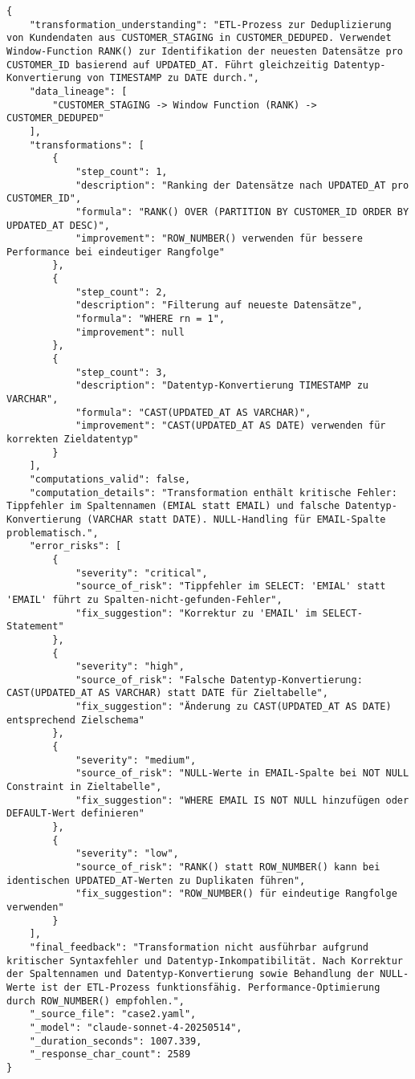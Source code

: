 \begin{lstlisting}[caption={Ausgabe: Claude Sonnet 4 Anwendungsfall 2 Hauptdurchlauf},label={claude_case2_prompt1}]
{
    "transformation_understanding": "ETL-Prozess zur Deduplizierung von Kundendaten aus CUSTOMER_STAGING in CUSTOMER_DEDUPED. Verwendet Window-Function RANK() zur Identifikation der neuesten Datensätze pro CUSTOMER_ID basierend auf UPDATED_AT. Führt gleichzeitig Datentyp-Konvertierung von TIMESTAMP zu DATE durch.",
    "data_lineage": [
        "CUSTOMER_STAGING -> Window Function (RANK) -> CUSTOMER_DEDUPED"
    ],
    "transformations": [
        {
            "step_count": 1,
            "description": "Ranking der Datensätze nach UPDATED_AT pro CUSTOMER_ID",
            "formula": "RANK() OVER (PARTITION BY CUSTOMER_ID ORDER BY UPDATED_AT DESC)",
            "improvement": "ROW_NUMBER() verwenden für bessere Performance bei eindeutiger Rangfolge"
        },
        {
            "step_count": 2,
            "description": "Filterung auf neueste Datensätze",
            "formula": "WHERE rn = 1",
            "improvement": null
        },
        {
            "step_count": 3,
            "description": "Datentyp-Konvertierung TIMESTAMP zu VARCHAR",
            "formula": "CAST(UPDATED_AT AS VARCHAR)",
            "improvement": "CAST(UPDATED_AT AS DATE) verwenden für korrekten Zieldatentyp"
        }
    ],
    "computations_valid": false,
    "computation_details": "Transformation enthält kritische Fehler: Tippfehler im Spaltennamen (EMIAL statt EMAIL) und falsche Datentyp-Konvertierung (VARCHAR statt DATE). NULL-Handling für EMAIL-Spalte problematisch.",
    "error_risks": [
        {
            "severity": "critical",
            "source_of_risk": "Tippfehler im SELECT: 'EMIAL' statt 'EMAIL' führt zu Spalten-nicht-gefunden-Fehler",
            "fix_suggestion": "Korrektur zu 'EMAIL' im SELECT-Statement"
        },
        {
            "severity": "high",
            "source_of_risk": "Falsche Datentyp-Konvertierung: CAST(UPDATED_AT AS VARCHAR) statt DATE für Zieltabelle",
            "fix_suggestion": "Änderung zu CAST(UPDATED_AT AS DATE) entsprechend Zielschema"
        },
        {
            "severity": "medium",
            "source_of_risk": "NULL-Werte in EMAIL-Spalte bei NOT NULL Constraint in Zieltabelle",
            "fix_suggestion": "WHERE EMAIL IS NOT NULL hinzufügen oder DEFAULT-Wert definieren"
        },
        {
            "severity": "low",
            "source_of_risk": "RANK() statt ROW_NUMBER() kann bei identischen UPDATED_AT-Werten zu Duplikaten führen",
            "fix_suggestion": "ROW_NUMBER() für eindeutige Rangfolge verwenden"
        }
    ],
    "final_feedback": "Transformation nicht ausführbar aufgrund kritischer Syntaxfehler und Datentyp-Inkompatibilität. Nach Korrektur der Spaltennamen und Datentyp-Konvertierung sowie Behandlung der NULL-Werte ist der ETL-Prozess funktionsfähig. Performance-Optimierung durch ROW_NUMBER() empfohlen.",
    "_source_file": "case2.yaml",
    "_model": "claude-sonnet-4-20250514",
    "_duration_seconds": 1007.339,
    "_response_char_count": 2589
}
\end{lstlisting}

